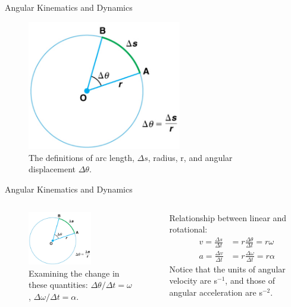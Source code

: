\documentclass{beamer}
\begin{document}
\begin{frame}{Angular Kinematics and Dynamics}
\begin{figure}
\centering
\includegraphics[width=0.6\textwidth]{figures/circle1.png}
\caption{\label{fig:circle1} The definitions of arc length, $\Delta s$, radius, r, and angular displacement $\Delta\theta$.}
\end{figure}
\end{frame}

\begin{frame}{Angular Kinematics and Dynamics}
\begin{columns}[T]
\begin{column}{0.5\textwidth}
\begin{figure}
\includegraphics[width=0.6\textwidth]{figures/circle1.png}
\caption{\label{fig:circle2} \small Examining the change in these quantities: $\Delta\theta/\Delta t = \omega$, $\Delta\omega/\Delta t = \alpha$.}
\end{figure}
\end{column}
\begin{column}{0.5\textwidth}
\centering
Relationship between linear and rotational:
\begin{align}
v = \frac{\Delta s}{\Delta t} &= r \frac{\Delta\theta}{\Delta t} = r\omega \\
a = \frac{\Delta v}{\Delta t} &= r \frac{\Delta\omega}{\Delta t} = r\alpha
\end{align}
Notice that the units of angular velocity are s$^{-1}$, and those of angular acceleration are s$^{-2}$.
\end{column}
\end{columns}
\end{frame}
\end{document}
